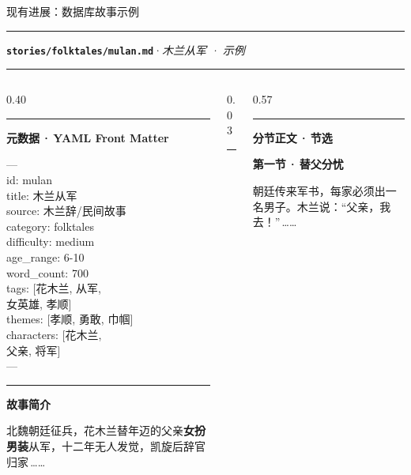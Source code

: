 \documentclass{beamer}
\newcommand{\kw}[1]{\textcolor{importantred}{\textbf{#1}}}
\newcommand{\goldrule}{\par\vspace{3pt}\noindent\textcolor{accentgold!60}{\rule{\linewidth}{0.4pt}}\par\vspace{3pt}}
\newcommand{\sidehead}[2][buptred]{%
  {\color{#1}\rule[-0.15em]{2.5pt}{1.0em}}\hspace{0.45em}\textbf{\small\color{darkred}#2}\par
  \vspace{2pt}%
}
\begin{document}
\begin{frame}[t]{现有进展：数据库故事示例}
    \vspace{-0.05cm}
    \noindent\textcolor{buptred}{\rule[-0.15em]{2.5pt}{1em}}\hspace{0.5em}%
    \textbf{\small\color{darkred}\texttt{stories/folktales/mulan.md}}\;\textcolor{gray!80}{·}\;\textit{\footnotesize 木兰从军 · 示例}
    \goldrule

    \footnotesize
    \begin{columns}[T, onlytextwidth]
        \begin{column}[T]{0.40\linewidth}
            \sidehead{元数据\,·\,YAML Front Matter}
            \vspace{2pt}
            \setlength{\fboxsep}{6pt}%
            \colorbox{lightred!55}{%
              \begin{minipage}{0.94\linewidth}
                \scriptsize\ttfamily
                \textcolor{gray!70}{---}\\
                id: mulan\\
                title: 木兰从军\\
                source: 木兰辞/民间故事\\
                category: folktales\\
                difficulty: medium\\
                age\_range: 6-10\\
                word\_count: 700\\
                tags: [花木兰, 从军, \\
                \phantom{tags: [}女英雄, 孝顺]\\
                themes: [孝顺, 勇敢, 巾帼]\\
                characters: [花木兰, \\
                \phantom{characters: [}父亲, 将军]\\
                \textcolor{gray!70}{---}
              \end{minipage}%
            }

            \vspace{6pt}
            \sidehead[accentgold]{故事简介}
            \scriptsize
            北魏朝廷征兵，花木兰替年迈的父亲\kw{女扮男装}从军，十二年无人发觉，凯旋后辞官归家\,\textcolor{gray!70}{……}
        \end{column}
        \begin{column}[T]{0.03\linewidth}
            \centering\textcolor{accentgold!60}{\rule{0.4pt}{13em}}
        \end{column}
        \begin{column}[T]{0.57\linewidth}
            \sidehead{分节正文\,·\,节选}
            \scriptsize
            \textbf{\color{darkred}第一节\,·\,替父分忧}\par
            朝廷传来军书，每家必须出一名男子。木兰说：``父亲，我去！''\,\textcolor{gray!70}{……}
            \vspace{3pt}


\end{column}
\end{columns}
\end{frame}
\end{document}
